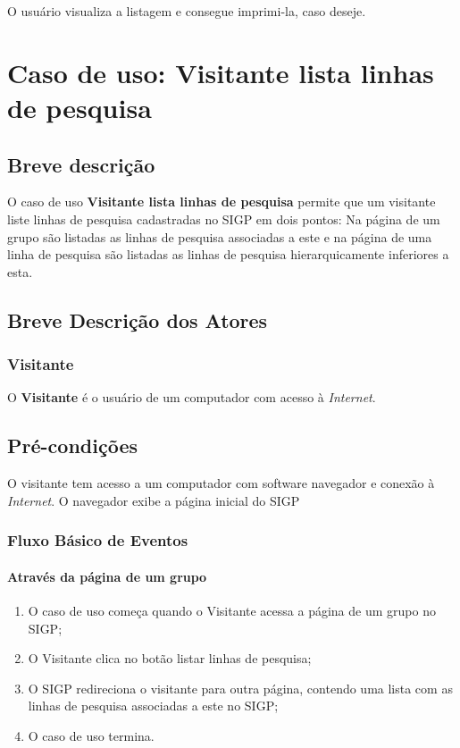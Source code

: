 \documentclass[11pt, a4paper,oneside]{book}
\begin{document}
O usuário visualiza a listagem e consegue imprimi-la, caso deseje.

%

\chapter[Caso de Uso]{Caso de uso: \bf Visitante lista linhas de pesquisa}
\label{cap:casodeuso}	

\section{Breve descrição}

O caso de uso \textbf{Visitante lista linhas de pesquisa} permite que um visitante liste linhas de pesquisa cadastradas no SIGP em dois pontos: Na página de um grupo são listadas as linhas de pesquisa associadas a este e na página de uma linha de pesquisa são listadas as linhas de pesquisa hierarquicamente inferiores a esta.

\section{Breve Descrição dos Atores}

\subsection{Visitante}

O \textbf{Visitante} é o usuário de um computador com acesso à \emph{Internet}.

\section{Pré-condições}
O visitante tem acesso a um computador com software navegador e conexão à \emph{Internet}.
O navegador exibe a página inicial do SIGP

\subsection{Fluxo Básico de Eventos}

\subsubsection{Através da página de um grupo}
\begin{enumerate}
\item O caso de uso começa quando o Visitante acessa a página de um grupo no SIGP;
\item O Visitante clica no botão listar linhas de pesquisa;
\item O SIGP redireciona o visitante para outra página, contendo uma lista com as linhas de pesquisa associadas a este no SIGP;
\item O caso de uso termina.
\end{enumerate}
\end{document}
